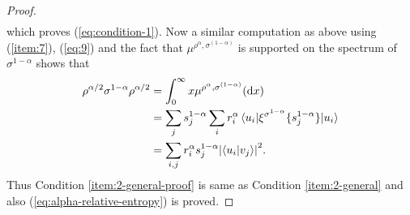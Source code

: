 \documentclass[12pt,a4paper,oneside]{article}
\numberwithin{equation}{section}
\theoremstyle{definition}  %
\theoremstyle{plain}  %
\theoremstyle{remark} %
\let\tr\relax
\DeclareMathOperator{\tr}{Tr}
\begin{document}
\begin{proof}
\begin{align*}
\end{align*}
which proves (\ref{eq:condition-1}).
Now a similar computation as above using (\ref{item:7}), (\ref{eq:9}) and the fact that $\mu^{\rho^\alpha,\sigma^{(1-\alpha)}}$ is supported on the spectrum of $\sigma^{1-\alpha}$ shows that \begin{align*}
  \tr \rho^{\alpha/2}\sigma^{1-\alpha}\rho^{\alpha/2} &= \int_0^\infty x\mu^{\rho^\alpha,\sigma^{(1-\alpha)}}(\dd x)\\
  &= \sum\limits_j s_j^{1-\alpha}\sum\limits_ir_i^{\alpha}\mel{u_i}{\xi^{\sigma^{1-\alpha}}\{s_j^{1-\alpha}\}}{u_i}\\
  & = \sum\limits_{i,j}r_i^{\alpha}s_j^{1-\alpha}\abs{\braket{u_i}{v_j}}^2.
\end{align*}
Thus  Condition \ref{item:2-general-proof}
 is same as Condition \ref{item:2-general} and also (\ref{eq:alpha-relative-entropy}) is proved.
 \end{proof}
\end{document}
